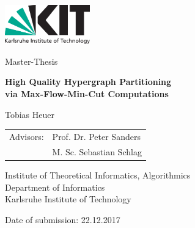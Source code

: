 \documentclass[12pt,a4paper,twoside, enabledeprecatedfontcommands]{scrartcl}
\numberwithin{equation}{section}
\begin{document}

\pagestyle{empty} %

\begin{titlepage}

  \begin{center}\large
 
    \quad\includegraphics[height=17mm]{../img/logo/kit_logo_en.pdf} \hfill

    \vfill

    Master-Thesis
    \vspace*{2cm}

    {\textbf{\huge High Quality Hypergraph Partitioning \\ via Max-Flow-Min-Cut Computations} \par}

    \vfill

    Tobias Heuer

    \vspace*{45mm}

    \begin{tabular}{rl}
      Advisors: & Prof. Dr. Peter Sanders \\
      & M. Sc. Sebastian Schlag\\
    \end{tabular}
    
    \vspace*{10mm}


    Institute of Theoretical Informatics, Algorithmics \\
    Department of Informatics \\
    Karlsruhe Institute of Technology

    \vspace*{15mm}

    Date of submission: 22.12.2017

    \vspace*{12mm}
  \end{center}

\end{titlepage}
\end{document}
